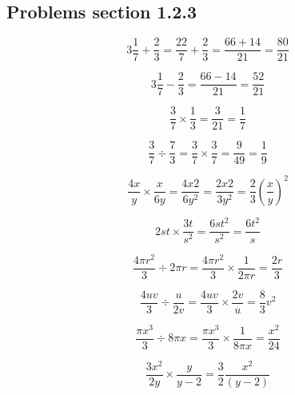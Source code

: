 \subsection{Problems section 1.2.3}

\begin{equation}
  3\frac{1}{7} + \frac{2}{3} = \frac{22}{7} + \frac{2}{3} = \frac{66 + 14}{21} = \frac{80}{21}
\end{equation}

\begin{equation}
  3\frac{1}{7} - \frac{2}{3} = \frac{66 - 14}{21} = \frac{52}{21}
\end{equation}

\begin{equation}
  \frac{3}{7} \times \frac{1}{3} = \frac{3}{21} = \frac{1}{7}
\end{equation}

\begin{equation}
  \frac{3}{7} \div \frac{7}{3}  = \frac{3}{7} \times \frac{3}{7} = \frac{9}{49} = \frac{1}{9}
\end{equation}

\begin{equation}
  \frac{4x}{y} \times \frac{x}{6y} = \frac{4x{2}}{6y^{2}} = \frac{2x{2}}{3y^{2}} = \frac{2}{3} \left ( \frac{x}{y} \right )^{2}
\end{equation}

\begin{equation}
  2st \times \frac{3t}{s^{2}} = \frac{6st^{2}}{s^{2}} = \frac{6 t^{2}}{s}
\end{equation}

\begin{equation}
  \frac{4 \pi r^{2}}{3} \div 2 \pi r = \frac{4 \pi r^{2}}{3} \times \frac{1}{2 \pi r} = \frac{2r}{3}
\end{equation}

\begin{equation}
  \frac{4uv}{3} \div \frac{u}{2v} = \frac{4uv}{3} \times \frac{2v}{u} = \frac{8}{3}v^{2}
\end{equation}

\begin{equation}
  \frac{\pi x^{3}}{3} \div 8 \pi x =  \frac{\pi x^{3}}{3} \times \frac{ 1 }{8 \pi x} = \frac{x^{2}}{24}
\end{equation}

\begin{equation}
  \frac{3x^{2}}{2y} \times \frac{y}{y-2} = \frac{3}{2}  \frac{x^{2}}{ ( y-2)} 
\end{equation}

